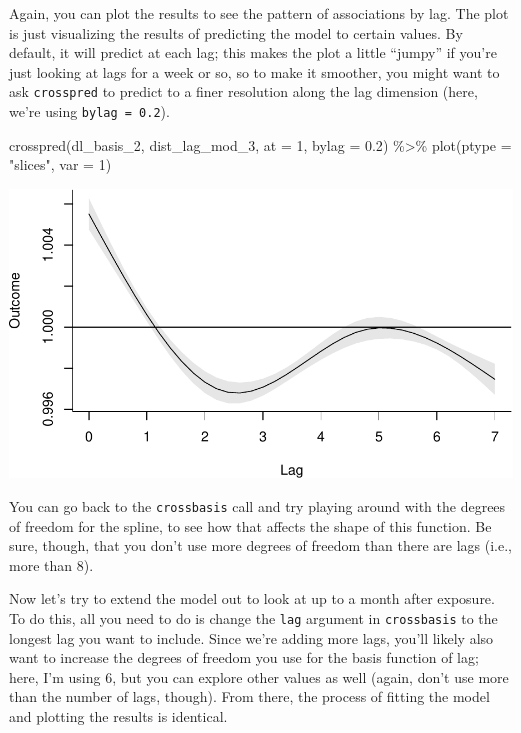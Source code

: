 \documentclass[
]{book}
\newenvironment{Shaded}{\begin{snugshade}}{\end{snugshade}}
\newcommand{\AttributeTok}[1]{\textcolor[rgb]{0.77,0.63,0.00}{#1}}
\newcommand{\DecValTok}[1]{\textcolor[rgb]{0.00,0.00,0.81}{#1}}
\newcommand{\FloatTok}[1]{\textcolor[rgb]{0.00,0.00,0.81}{#1}}
\newcommand{\FunctionTok}[1]{\textcolor[rgb]{0.00,0.00,0.00}{#1}}
\newcommand{\NormalTok}[1]{#1}
\newcommand{\SpecialCharTok}[1]{\textcolor[rgb]{0.00,0.00,0.00}{#1}}
\newcommand{\StringTok}[1]{\textcolor[rgb]{0.31,0.60,0.02}{#1}}
\begin{document}
Again, you can plot the results to see the pattern of associations by lag. The plot
is just visualizing the results of predicting the model to certain values. By default,
it will predict at each lag; this makes the plot a little ``jumpy'' if you're just looking
at lags for a week or so, so to make it smoother, you might want to ask \texttt{crosspred} to
predict to a finer resolution along the lag dimension (here, we're using \texttt{bylag\ =\ 0.2}).

\begin{Shaded}
\begin{Highlighting}[]
\FunctionTok{crosspred}\NormalTok{(dl\_basis\_2, dist\_lag\_mod\_3, }\AttributeTok{at =} \DecValTok{1}\NormalTok{, }\AttributeTok{bylag =} \FloatTok{0.2}\NormalTok{) }\SpecialCharTok{\%\textgreater{}\%} 
  \FunctionTok{plot}\NormalTok{(}\AttributeTok{ptype =} \StringTok{"slices"}\NormalTok{, }\AttributeTok{var =} \DecValTok{1}\NormalTok{)}
\end{Highlighting}
\end{Shaded}

\includegraphics{adv_epi_analysis_files/figure-latex/unnamed-chunk-100-1.pdf}

You can go back to the \texttt{crossbasis} call and try playing around with the degrees of freedom
for the spline, to see how that affects the shape of this function. Be sure, though, that
you don't use more degrees of freedom than there are lags (i.e., more than 8).

Now let's try to extend the model out to look at up to a month after exposure. To do this,
all you need to do is change the \texttt{lag} argument in \texttt{crossbasis} to the longest lag you
want to include. Since we're adding more lags, you'll likely also want to increase the
degrees of freedom you use for the basis function of lag; here, I'm using 6, but you can
explore other values as well (again, don't use more than the number of lags, though).
From there, the process of fitting the model and plotting the results is identical.
\end{document}
